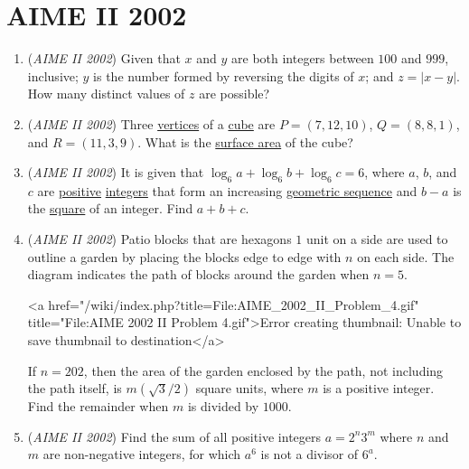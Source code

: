 \section{AIME II 2002}
        \begin{enumerate}
        	\item (\textit{AIME II 2002}) Given that $x$ and $y$ are both integers between $100$ and $999$, inclusive; $y$ is the number formed by reversing the digits of $x$; and $z=|x-y|$. How many distinct values of $z$ are possible?


 

	\item (\textit{AIME II 2002}) Three \href{https://artofproblemsolving.com/wiki/index.php?title=Vertex}{vertices} of a \href{https://artofproblemsolving.com/wiki/index.php?title=Cube}{cube} are $P=(7,12,10)$, $Q=(8,8,1)$, and $R=(11,3,9)$. What is the \href{https://artofproblemsolving.com/wiki/index.php?title=Surface\_area}{surface area} of the cube?


 

	\item (\textit{AIME II 2002}) It is given that $\log_{6}a + \log_{6}b + \log_{6}c = 6$, where $a$, $b$, and $c$ are \href{https://artofproblemsolving.com/wiki/index.php?title=Positive}{positive} \href{https://artofproblemsolving.com/wiki/index.php?title=Integer}{integers} that form an increasing \href{https://artofproblemsolving.com/wiki/index.php?title=Geometric\_sequence}{geometric sequence} and $b - a$ is the \href{https://artofproblemsolving.com/wiki/index.php?title=Perfect\_square}{square} of an integer. Find $a + b + c$.


 

	\item (\textit{AIME II 2002}) Patio blocks that are hexagons $1$ unit on a side are used to outline a garden by placing the blocks edge to edge with $n$ on each side. The diagram indicates the path of blocks around the garden when $n=5$.


 <a href="/wiki/index.php?title=File:AIME\_2002\_II\_Problem\_4.gif" title="File:AIME 2002 II Problem 4.gif">Error creating thumbnail: Unable to save thumbnail to destination</a>


 If $n=202$, then the area of the garden enclosed by the path, not including the path itself, is $m\left(\sqrt3/2\right)$ square units, where $m$ is a positive integer. Find the remainder when $m$ is divided by $1000$.


 

	\item (\textit{AIME II 2002}) Find the sum of all positive integers $a=2^n3^m$ where $n$ and $m$ are non-negative integers, for which $a^6$ is not a divisor of $6^a$.



\end{enumerate}
